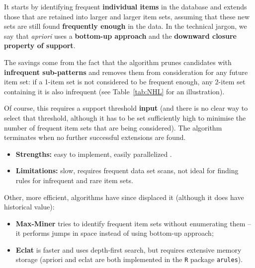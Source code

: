 \par It starts by identifying frequent \textbf{individual items} in the database and extends those that are retained into larger and larger item sets, assuming that these new sets are still found \textbf{frequently enough} in the data. In the technical jargon, we say that \textit{apriori} uses a \textbf{bottom-up approach} and the \textbf{downward closure property of support}. \par The savings come from the fact that the algorithm prunes candidates with \textbf{infrequent sub-patterns} and removes them from consideration for any future item set: if a 1-item set is not considered to be frequent enough, any 2-item set containing it is also infrequent (see Table~\ref{tab:NHL} for an illustration). \par Of course, this requires a support threshold \textbf{input} (and there is no clear way to select that threshold, although it has to be set sufficiently high to minimise the number of frequent item sets that are being considered). The algorithm terminates when no further successful extensions are found.
\begin{itemize}[noitemsep] \item \textbf{Strengths:} easy to implement, easily parallelized \cite{DSML_MMD}.
\item \textbf{Limitations:} slow, requires frequent data set scans, not ideal for finding rules for infrequent and rare item sets. 
\end{itemize}
Other, more efficient, algorithms have since displaced it (although it does have historical value):
\begin{itemize}[noitemsep]
\item \textbf{Max-Miner} tries to identify frequent item sets without enumerating them -- it performs jumps in space instead of using bottom-up approach; 
\item \textbf{Eclat} is faster and uses depth-first search, but requires extensive memory storage (apriori and eclat are both implemented in the \texttt{R} package \texttt{arules}).
\end{itemize}
